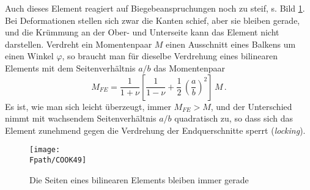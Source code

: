Auch dieses Element reagiert auf Biegebeanspruchungen noch zu steif, s. Bild
\ref{Cook49}. Bei Deformationen stellen sich zwar die Kanten schief, aber sie bleiben
gerade, und die Kr\"{u}mmung an der Ober- und Unterseite kann das Element nicht darstellen.
Verdreht ein Momentenpaar $M$ einen Ausschnitt eines Balkens um einen Winkel $\varphi$,
so braucht man f\"{u}r dieselbe Verdrehung eines bilinearen Elements mit dem
Seitenverh\"{a}ltnis $a/b$ das Momentenpaar
$$
M_{FE} = \frac{1}{1 + \nu} \left [ \frac{1}{1-\nu} + \frac{1}{2}\,\left
(\frac{a}{b}\right )^2 \right ]\,M\,.
$$
Es ist, wie man sich leicht \"{u}berzeugt, immer $M_{FE} > M$, und der Unterschied nimmt mit
wachsendem Seitenverh\"{a}ltnis $a/b$ quadratisch zu, so dass sich das Element zunehmend
gegen die Verdrehung der Endquerschnitte sperrt ({\em locking\/}).
\begin{figure}[tbp]
\if {} \sidecaption \fi
\texttt{[image: \\Fpath/COOK49]}
\caption{Die Seiten eines bilinearen Elements bleiben immer gerade} \label{Cook49}
\end{figure}%

